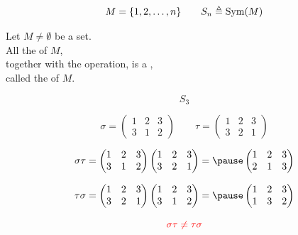 
\begin{frame}
  \[
    M = \{1, 2, \dots, n\} \qquad
    S_{n} \triangleq \text{Sym}(M)
  \]
  \begin{definition}
    Let $M \neq \emptyset$ be a set. \\[3pt]
    All the  of $M$, \\[3pt]
    together with the  operation,
    is a , \\[3pt]
    called the  of $M$.
  \end{definition}

  \pause
  \[
    S_{3}
  \]
  
\end{frame}

\begin{frame}{}
  \[
    \sigma = \begin{pmatrix}
      1 & 2 & 3 \\
      3 & 1 & 2
    \end{pmatrix} \qquad
    \tau = \begin{pmatrix}
      1 & 2 & 3 \\
      3 & 2 & 1
    \end{pmatrix}
  \]

  \pause
  \vspace{0.30cm}
  \[
    \sigma \tau = \begin{pmatrix}
      1 & 2 & 3 \\
      3 & 1 & 2
    \end{pmatrix}
    \begin{pmatrix}
      1 & 2 & 3 \\
      3 & 2 & 1
    \end{pmatrix} = \pause
    \begin{pmatrix}
      1 & 2 & 3 \\
      2 & 1 & 3
    \end{pmatrix}
  \]

  \pause
  \vspace{0.30cm}
  \[
    \tau \sigma = \begin{pmatrix}
      1 & 2 & 3 \\
      3 & 2 & 1
    \end{pmatrix}
    \begin{pmatrix}
      1 & 2 & 3 \\
      3 & 1 & 2
    \end{pmatrix} = \pause
    \begin{pmatrix}
      1 & 2 & 3 \\
      1 & 3 & 2
    \end{pmatrix}
  \]

  \pause
  \[
    \textcolor{red}{\sigma \tau \neq \tau \sigma}
  \]
\end{frame}

